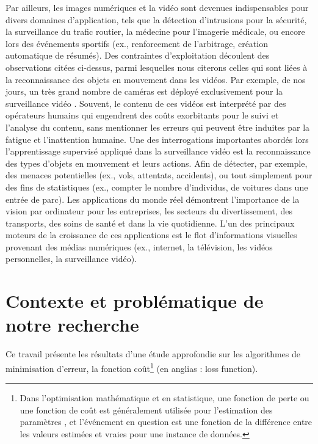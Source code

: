		Par ailleurs, les images numériques et la vidéo sont devenues indispensables pour divers domaines d'application, tels que la détection d'intrusions pour la sécurité, la surveillance du trafic routier, la médecine pour l'imagerie médicale, ou encore lors des événements sportifs (ex., renforcement de l'arbitrage, création automatique de résumés).
		Des contraintes d'exploitation découlent des observations citées ci-dessus, parmi lesquelles nous citerons celles qui sont liées à la reconnaissance des objets en mouvement dans les vidéos. Par exemple, de nos jours, un très grand nombre de caméras est déployé exclusivement pour la surveillance vidéo \cite{ahadjitse2013reconnaissance} . 
		Souvent, le contenu de ces vidéos est interprété par des opérateurs humains qui engendrent des coûts exorbitants pour le suivi et l'analyse du contenu, sans mentionner les erreurs qui peuvent être induites par la fatigue et l'inattention humaine. 
		Une des interrogations importantes abordés lors  l'apprentissage supervisé appliqué dans la surveillance vidéo est la reconnaissance des types d'objets en mouvement et leurs actions. Afin de détecter, par exemple, des menaces potentielles (ex., vols, attentats, accidents), ou tout simplement pour des fins de statistiques (ex., compter le nombre d'individus, de voitures dans une entrée de parc).	
		Les applications du monde réel démontrent l'importance de la vision par ordinateur pour les entreprises, les secteurs du divertissement, des transports, des soins de santé et dans la vie quotidienne. L'un des principaux moteurs de la croissance de ces applications est le flot d'informations visuelles provenant des médias numériques (ex., internet, la télévision, les vidéos personnelles, la surveillance vidéo). 
		
		

	\section{Contexte et problématique de notre recherche}
		Ce travail présente les résultats d'une étude approfondie sur les algorithmes de minimisation d’erreur, la fonction coût\footnote{Dans l'optimisation mathématique et en statistique, une fonction de perte ou une fonction de coût est généralement utilisée pour l'estimation des paramètres , et l'événement en question est une fonction de la différence entre les valeurs estimées et vraies pour une instance de données.} (en anglias : loss function). 
		
